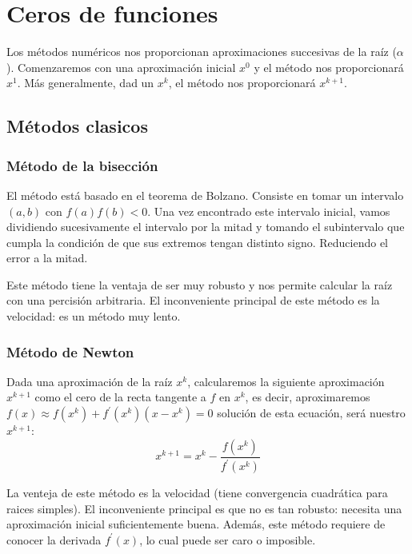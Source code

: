 \chapter{Ceros de funciones}

Los métodos numéricos nos proporcionan aproximaciones succesivas de la raíz ($\alpha$).
Comenzaremos con una aproximación inicial $x^0$  y el método nos proporcionará $x^1$. Más
generalmente, dad un $x^k$, el método nos proporcionará $x^{k+1}$.

\section{Métodos clasicos}

\subsection{Método de la bisección}

El método está basado en el teorema de Bolzano. Consiste en tomar un intervalo $(a, b)$
con $f(a)f(b) < 0$. Una vez encontrado este intervalo inicial, vamos dividiendo sucesivamente
el intervalo por la mitad y tomando el subintervalo que cumpla la condición de que sus extremos tengan
distinto signo. Reduciendo el error a la mitad.

Este método tiene la ventaja de ser muy robusto y nos permite calcular la raíz con una percisión arbitraria.
El inconveniente principal de este método es la velocidad: es un método muy lento.

\subsection{Método de Newton}

Dada una aproximación de la raíz $x^k$, calcularemos la siguiente aproximación $x^{k+1}$ como el cero de 
la recta tangente a $f$ en $x^k$, es decir, aproximaremos $f(x) \approx
f\left( x^k \right) + f^\prime\left( x^k \right) \left( x - x^k \right) = 0$  solución de esta ecuación,
será nuestro $x^{k+1}$:
\[
    x^{k+1} = x^k - \frac{f\left( x^k \right)}{f^\prime\left( x^k \right)}
\]

La venteja de este método es la velocidad (tiene convergencia cuadrática para raices simples).
El inconveniente principal es que no es tan robusto: necesita una aproximación inicial suficientemente buena.
Además, este método requiere de conocer la derivada $f^\prime(x)$, lo cual puede ser caro o imposible.


